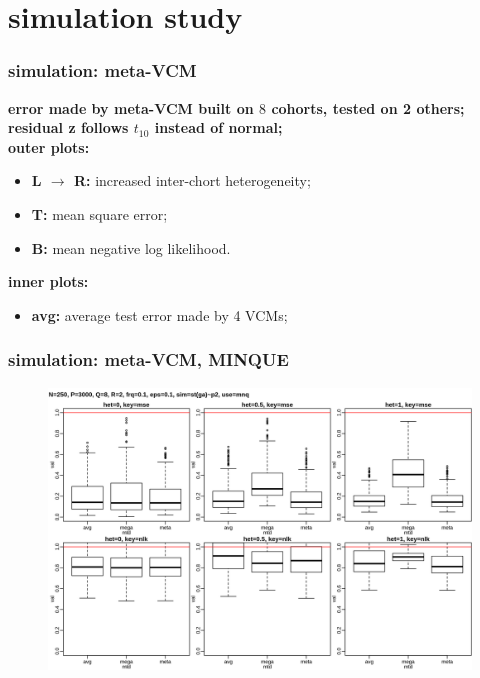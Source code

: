 \documentclass{beamer}
\begin{document}
\section{simulation study}
\begin{frame}\frametitle{simulation: meta-VCM}
  \textbf{error made by meta-VCM built on $8$ cohorts, tested on 2 others;} \\
  \textbf{residual z follows $t_{10}$ instead of normal;} \\
  {\color{blue}\textbf{outer plots:}}
  \begin{itemize}
  \item \textbf{L $\to$ R:} increased inter-chort heterogeneity;
  \item \textbf{T:} mean square error;
  \item \textbf{B:} mean negative log likelihood.
  \end{itemize}
  {\color{blue}\textbf{inner plots:}}
  \begin{itemize}
  \item \textbf{avg:} average test error made by 4 VCMs;
  \end{itemize}
\end{frame}
\begin{frame} \frametitle{simulation: meta-VCM, MINQUE}
  \begin{figure}
    \centering \includegraphics[width=.95\linewidth]{img/jsm_mm3_mnq}
  \end{figure}
\end{frame}
\end{document}
